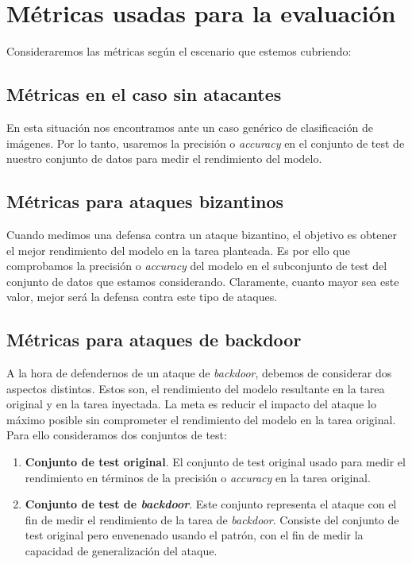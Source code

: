 \section{Métricas usadas para la evaluación}\label{sec:metricas}
Consideraremos las métricas según el escenario que estemos cubriendo:

\subsection{Métricas en el caso sin atacantes}
En esta situación nos encontramos ante un caso genérico de clasificación de imágenes. Por lo tanto, usaremos la precisión o \textit{accuracy} en el conjunto de test de nuestro conjunto de datos para medir el rendimiento del modelo.

\subsection{Métricas para ataques bizantinos}
Cuando medimos una defensa contra un ataque bizantino, el objetivo es obtener el mejor rendimiento del modelo en la tarea planteada. Es por ello que comprobamos la precisión o \textit{accuracy} del modelo en el subconjunto de test del conjunto de datos que estamos considerando. Claramente, cuanto mayor sea este valor, mejor será la defensa contra este tipo de ataques.

\subsection{Métricas para ataques de backdoor}
A la hora de defendernos de un ataque de \textit{backdoor}, debemos de considerar dos aspectos distintos. Estos son, el rendimiento del modelo resultante en la tarea original y en la tarea inyectada. La meta es reducir el impacto del ataque lo máximo posible sin comprometer el rendimiento del modelo en la tarea original. Para ello consideramos dos conjuntos de test:
\begin{enumerate}
    \item \textbf{Conjunto de test original}. El conjunto de test original usado para medir el rendimiento en términos de la precisión o \textit{accuracy} en la tarea original.
    \item \textbf{Conjunto de test de \textit{backdoor}}. Este conjunto representa el ataque con el fin de medir el rendimiento de la tarea de \textit{backdoor}. Consiste del conjunto de test original pero envenenado usando el patrón, con el fin de medir la capacidad de generalización del ataque. 
\end{enumerate}

